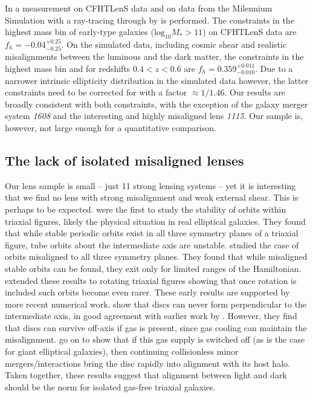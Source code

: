 \documentclass[useAMS,usenatbib]{mn2e}
\begin{document}
In \citet{2015arXiv150704301S} a measurement on CFHTLenS data and on data from the Milennium Simulation \citep{2005Natur.435..629S} with a ray-tracing through by \citet{2009A&A...499...31H} is performed. The constraints in the highest mass bin of early-type galaxies ($\mathrm{log_{10}}M_{*}>11$) on CFHTLenS data are $f_{h}=-0.04^{+0.25}_{-0.25}$. On the simulated data, including cosmic shear and realistic misalignments between the luminous and the dark matter, the constraints in the highest mass bin and for redshifts $0.4<z<0.6$ are $f_{h} = 0.359^{+0.011}_{-0.010}$. Due to a narrower intrinsic ellipticity distribution in the simulated data however, the latter constraints need to be corrected for with a factor $\approx 1/1.46$. Our results are broadly consistent with both constraints, with the exception of the galaxy merger system \textit{1608} and the interesting and highly misaligned lens \textit{1115}. Our sample is, however, not large enough for a quantitative comparison.

\subsection{The lack of isolated misaligned lenses}

Our lens sample is small -- just 11 strong lensing systems -- yet it is interesting that we find no lens with strong misalignment and weak external shear. This is perhaps to be expected. \citet{1979ApJ...233..872H} were the first to study the stability of orbits within triaxial figures, likely the physical situation in real elliptical galaxies. They found that while stable periodic orbits exist in all three symmetry planes of a triaxial figure, tube orbits about the intermediate axis are unstable. \citet{1985MNRAS.215..731D} studied the case of orbits misaligned to all three symmetry planes. They found that while misaligned stable orbits can be found, they exit only for limited ranges of the Hamiltonian. \citet{1988A&A...206..269M} extended these results to rotating triaxial figures showing that once rotation is included such orbits become even rarer. These early results are supported by more recent numerical work. \citet{2013MNRAS.434.2971D} show that discs can never form perpendicular to the intermediate axis, in good agreement with earlier work by \citet{1979ApJ...233..872H}. However, they find that discs can survive off-axis if gas is present, since gas cooling can maintain the misalignment. \citet{2015MNRAS.452.4094D} go on to show that if this gas supply is switched off (as is the case for giant elliptical galaxies), then continuing collisionless minor mergers/interactions bring the disc rapidly into alignment with its host halo. Taken together, these results suggest that alignment between light and dark should be the norm for isolated gas-free triaxial galaxies.
\end{document}
